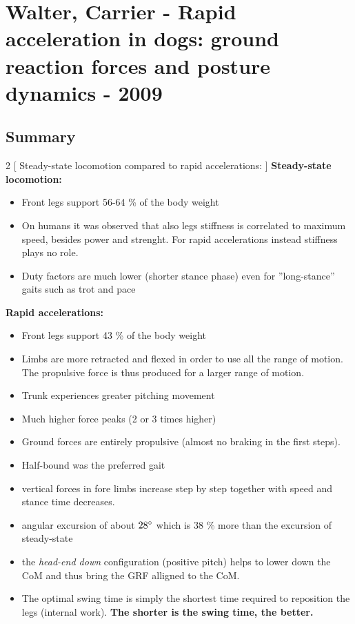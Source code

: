 \section{Walter, Carrier - Rapid acceleration in dogs: ground reaction forces and posture dynamics - 2009}

\subsection*{Summary}

\begin{multicols}{2}
[
Steady-state locomotion compared to rapid accelerations:
]
\textbf{Steady-state locomotion:}
\begin{itemize}
\item Front legs support 56-64 \% of the body weight
\item On humans it was observed that also legs stiffness is correlated to maximum speed, besides power and strenght. For rapid accelerations instead stiffness plays no role.
\item Duty factors are much lower (shorter stance phase) even for ''long-stance'' gaits such as trot and pace
\end{itemize}
\columnbreak

\textbf{Rapid accelerations:}
\begin{itemize}
\item Front legs support 43 \% of the body weight
\item Limbs are more retracted and flexed in order to use all the range of motion. The propulsive force is thus produced for a larger range of motion.
\item Trunk experiences greater pitching movement
\item Much higher force peaks (2 or 3 times higher)
\item Ground forces are entirely propulsive (almost no braking in the first steps).
\item Half-bound was the preferred gait
\item vertical forces in fore limbs increase step by step together with speed and stance time decreases.
\item angular excursion of about $28\degree$ which is 38 \% more than the excursion of steady-state
\item the \textit{head-end down} configuration (positive pitch) helps to lower down the CoM and thus bring the GRF alligned to the CoM.
\item The optimal swing time is simply the shortest time required to reposition the legs (internal work). \textbf{The shorter is the swing time, the better.}
\end{itemize}

\end{multicols}

